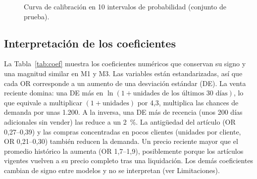\documentclass[
  journal=largetwo,
  manuscript=Laboratorio-Numero-02,
  year=2026,
  volume=1
]{cup-journal}
\newcommand{\datos}[1]{fig/data/#1}
\begin{document}
\begin{figure}[!ht]
\centering
{}
\caption{Curva de calibración en 10 intervalos de probabilidad (conjunto de prueba).}
\label{fig:calibracion}
\end{figure}

\subsection{Interpretación de los coeficientes}

La Tabla~\ref{tab:coef} muestra los coeficientes numéricos que conservan su signo y una magnitud similar en M1 y M3. Las variables están estandarizadas, así que cada OR corresponde a un aumento de una desviación estándar (DE). La venta reciente domina: una DE más en $\ln(1+\text{unidades de los últimos 30 días})$, lo que equivale a multiplicar $(1+\text{unidades})$ por 4,3, multiplica las chances de demanda por unas 1.200. A la inversa, una DE más de recencia (unos 200 días adicionales sin vender) las reduce a un 2~\%. La antigüedad del artículo (OR 0,27--0,39) y las compras concentradas en pocos clientes (unidades por cliente, OR 0,21--0,30) también reducen la demanda. Un precio reciente mayor que el promedio histórico la aumenta (OR 1,7--1,9), posiblemente porque los artículos vigentes vuelven a su precio completo tras una liquidación. Los demás coeficientes cambian de signo entre modelos y no se interpretan (ver Limitaciones).
\end{document}
